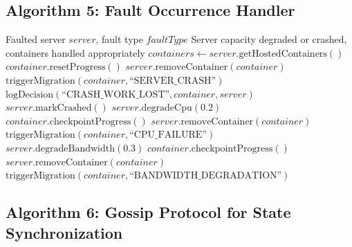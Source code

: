 \documentclass[12pt,a4paper]{article}
\begin{document}
\subsection{Algorithm 5: Fault Occurrence Handler}

\begin{algorithm}[H]
\caption{Handle Fault Occurrence Event}
\begin{algorithmic}[1]
\Require Faulted server $server$, fault type $faultType$
\Ensure Server capacity degraded or crashed, containers handled appropriately
\State $containers \gets server.\text{getHostedContainers}()$
    \State {}
        \State $container.\text{resetProgress}()$ 
        \State $server.\text{removeContainer}(container)$
        \State $\text{triggerMigration}(container, \text{``SERVER\_CRASH''})$
        \State $\text{logDecision}(\text{``CRASH\_WORK\_LOST''}, container, server)$
    \EndFor
    \State $server.\text{markCrashed}()$
    \State $server.\text{degradeCpu}(0.2)$ 
        \State $container.\text{checkpointProgress}()$ 
        \State $server.\text{removeContainer}(container)$
        \State $\text{triggerMigration}(container, \text{``CPU\_FAILURE''})$
    \EndFor
{}
    \State $server.\text{degradeBandwidth}(0.3)$ 
        \State $container.\text{checkpointProgress}()$
        \State $server.\text{removeContainer}(container)$
        \State $\text{triggerMigration}(container, \text{``BANDWIDTH\_DEGRADATION''})$
    \EndFor
\EndIf
\end{algorithmic}
\end{algorithm}

\subsection{Algorithm 6: Gossip Protocol for State Synchronization}
\end{document}
